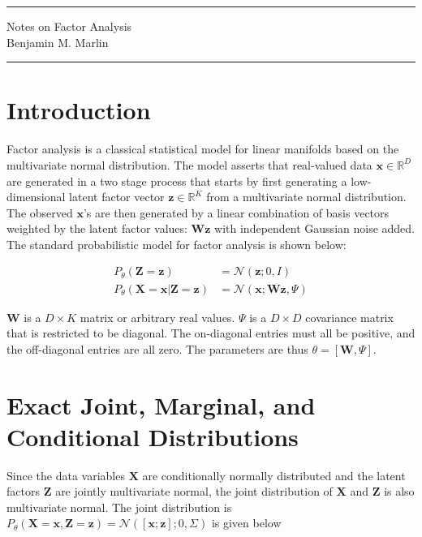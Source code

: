 \documentclass[11pt]{article}
\newcommand{\mbf}[1]{{\mathbf{#1}}}
\begin{document}
{\centering
  \rule{6.3in}{2pt}
  \vspace{1em}
  \Large{Notes on Factor Analysis\\}
  Benjamin M. Marlin\\
  \vspace{0.1em}
  \rule{6.3in}{1.5pt}
}
\vspace{1pc}


\section{Introduction}


Factor analysis is a classical statistical model for linear manifolds based 
on the multivariate normal distribution. The model asserts that real-valued data 
$\mbf{x}\in\mathbb{R}^D$ are generated in a two stage
process that starts by first generating a low-dimensional latent factor 
vector $\mbf{z}\in\mathbb{R}^K$ from
a multivariate normal distribution. The observed $\mbf{x}$'s are then generated by a 
linear combination of basis vectors weighted
by the latent factor values: $\mbf{W}\mbf{z}$ with independent 
Gaussian noise added.
The standard probabilistic model for factor analysis is shown below: 

\begin{align}
	\label{eq:pz}
	P_{\theta}(\mbf{Z}=\mbf{z}) &= \mathcal{N}(\mbf{z}; 0,I)\\
	\label{eq:pxgz}
	P_{\theta}(\mbf{X}=\mbf{x}|\mbf{Z}=\mbf{z})&=\mathcal{N}(\mbf{x}; \mbf{Wz},\Psi)
\end{align}

$\mbf{W}$ is a $D\times K$ matrix or arbitrary real values. $\Psi$ is a $D\times D$ covariance
matrix that is restricted to be diagonal. The on-diagonal entries must all be positive,
and the off-diagonal entries are all zero. The parameters are thus $\theta=[\mbf{W},\Psi]$.

\section{Exact Joint, Marginal, and Conditional Distributions}

Since the data variables $\mbf{X}$ are conditionally normally distributed and the 
latent factors $\mbf{Z}$  are jointly multivariate normal, the joint
distribution of $\mbf{X}$ and $\mbf{Z}$ is also multivariate normal. The joint 
distribution is $P_{\theta}(\mbf{X}=\mbf{x}, \mbf{Z}=\mbf{z})=\mathcal{N}([\mbf{x};\mbf{z}]; 0, \Sigma)$
is given below
\end{document}
